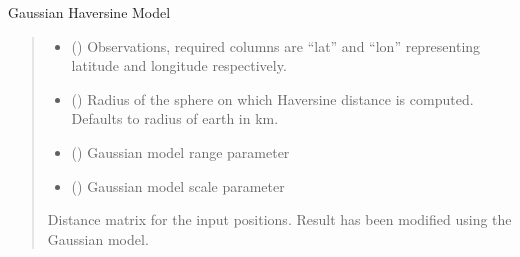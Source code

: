 \documentclass[letterpaper,10pt,english]{sphinxmanual}
\begin{document}
\begin{fulllineitems}
\label{\detokenize{misc:glomar_gridding.distances.haversine_gaussian}}
\pysigstartsignatures
\pysiglinewithargsret
{}
{\sphinxparamcomma {}\sphinxparamcomma {}\sphinxparamcomma {}}
{}
\pysigstopsignatures
\sphinxAtStartPar
Gaussian Haversine Model
\begin{quote}\begin{description}
\begin{itemize}
\item {}
\sphinxAtStartPar
{} () \textendash{} Observations, required columns are “lat” and “lon” representing
latitude and longitude respectively.

\item {}
\sphinxAtStartPar
{} () \textendash{} Radius of the sphere on which Haversine distance is computed. Defaults
to radius of earth in km.

\item {}
\sphinxAtStartPar
{} () \textendash{} Gaussian model range parameter

\item {}
\sphinxAtStartPar
{} () \textendash{} Gaussian model scale parameter

\end{itemize}

\sphinxAtStartPar
{} \textendash{} Distance matrix for the input positions. Result has been modified using
the Gaussian model.

\sphinxAtStartPar
{}

\end{description}\end{quote}

\end{fulllineitems}
\end{document}
